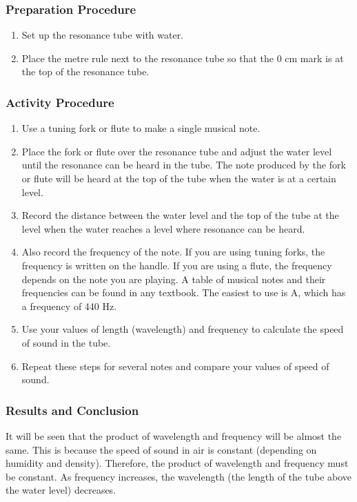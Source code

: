 \subsubsection*{Preparation Procedure}
\begin{enumerate}
\item{Set up the resonance tube with water.} 
\item{Place the metre rule next to the resonance tube so that the 0 cm mark is at the top of the resonance tube.} 
\end{enumerate}

\subsubsection*{Activity Procedure}
\begin{enumerate}
\item{Use a tuning fork or flute to make a single musical note.} 
\item{Place the fork or flute over the resonance tube and adjust the water level until the resonance can be heard in the tube. The note produced by the fork or flute will be heard at the top of the tube when the water is at a certain level.} 
\item{Record the distance between the water level and the top of the tube at the level when the water reaches a level where resonance can be heard.} 
\item{Also record the frequency of the note. If you are using tuning forks, the frequency is written on the handle. If you are using a flute, the frequency depends on the note you are playing. A table of musical notes and their frequencies can be found in any textbook. The easiest to use is A, which has a frequency of 440 Hz.} 
\item{Use your values of length (wavelength) and frequency to calculate the speed of sound in the tube.} 
\item{Repeat these steps for several notes and compare your values of speed of sound.} 
\end{enumerate}

\subsubsection*{Results and Conclusion}
It will be seen that the product of wavelength and frequency will be almost the same. This is because the speed of sound in air is constant (depending on humidity and density). Therefore, the product of wavelength and frequency must be constant. As frequency increases, the wavelength (the length of the tube above the water level) decreases.  

